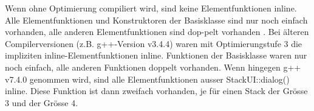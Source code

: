 Wenn ohne Optimierung compiliert wird, sind keine Elementfunktionen inline. Alle Elementfunktionen und Konstruktoren der Basisklasse sind nur noch einfach vorhanden, alle anderen Elementfunktionen sind dop-pelt vorhanden
.
Bei älteren Compilerversionen (z.B. g++-Version v3.4.4) waren mit Optimierungstufe 3 die impliziten inline-Elementfunktionen inline. Funktionen der Basisklasse waren nur noch einfach, alle anderen Funktionen doppelt vorhanden. Wenn hingegen g++ v7.4.0 genommen wird, sind alle Elementfunktionen ausser StackUI::dialog() inline. Diese Funktion ist dann zweifach vorhanden, je für einen Stack der Grösse 3 und der Grösse 4.


\noindent\makebox[\linewidth]{\rule{\paperwidth}{0.4pt}}

\noindent\makebox[\linewidth]{\rule{\paperwidth}{0.4pt}}

\noindent\makebox[\linewidth]{\rule{\paperwidth}{0.4pt}}

\noindent\makebox[\linewidth]{\rule{\paperwidth}{0.4pt}}

\noindent\makebox[\linewidth]{\rule{\paperwidth}{0.4pt}}

\noindent\makebox[\linewidth]{\rule{\paperwidth}{0.4pt}}

\noindent\makebox[\linewidth]{\rule{\paperwidth}{0.4pt}}
